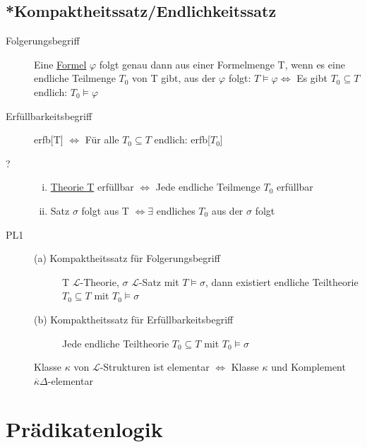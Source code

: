 \documentclass[12pt,a4paper]{article} %
\begin{document}
	\subsection{*Kompaktheitssatz/Endlichkeitssatz}
	\begin{description}
		\item[Folgerungsbegriff] Eine \hyperref[Formel]{Formel} $\varphi$ folgt genau dann aus einer Formelmenge T, wenn es eine endliche Teilmenge $T_0$ von T gibt, aus der $\varphi$ folgt: $T \hyperref[Erfullbar]{\vDash} \varphi \Leftrightarrow$ Es gibt $T_0 \subseteq T$ endlich: $T_0 \hyperref[Erfullbar]{\vDash} \varphi$
		\item[Erfüllbarkeitsbegriff] erfb[T] $\Leftrightarrow$ Für alle $T_0 \subseteq T$ endlich: erfb[$T_0$]
		\item[?] \begin{enumerate}[(i)]
			\item \hyperref[Theorie]{Theorie T} erfüllbar $\Leftrightarrow$ Jede endliche Teilmenge $T_0$ erfüllbar 
			\item Satz $\sigma$ folgt aus T $\Leftrightarrow \exists$ endliches $T_0$ aus der $\sigma$ folgt
		\end{enumerate}
		\item[PL1] \begin{description}
			\item[(a) Kompaktheitssatz für Folgerungsbegriff] T $\mathcal{L}$-Theorie, $\sigma$ $\mathcal{L}$-Satz mit $T \vDash \sigma$, dann existiert endliche Teiltheorie $T_0 \subseteq T$ mit $T_0 \vDash \sigma$ 
			\item[(b) Kompaktheitssatz für Erfüllbarkeitsbegriff] Jede endliche Teiltheorie $T_0 \subseteq T$ mit $T_0 \vDash \sigma$ 
		\end{description}
		
		Klasse $\kappa$ von $\mathcal{L}$-Strukturen ist elementar $\Leftrightarrow$ Klasse $\kappa$ und Komplement $\overline{\kappa} \Delta$-elementar 
	\end{description}
	
	\newpage
	\section{Prädikatenlogik}
\end{document}
